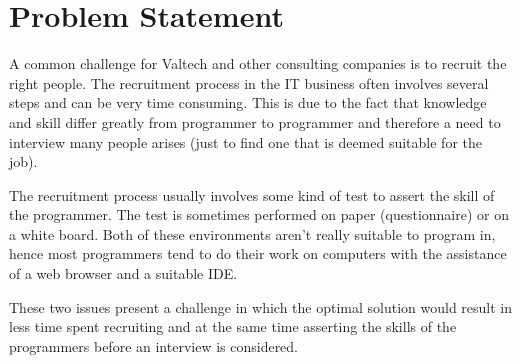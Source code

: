 \section{Problem Statement}
A common challenge for Valtech and other consulting companies is to recruit the right people.  The recruitment process in the IT business often involves several steps and can be very time consuming. This is due to the fact that knowledge and skill differ greatly from programmer to programmer and therefore a need to interview many people arises (just to find one that is deemed suitable for the job). 

The recruitment process usually involves some kind of test to assert the skill of the programmer. The test is sometimes performed on paper (questionnaire) or on a white board. Both of these environments aren't really suitable to program in, hence most programmers tend to do their work on computers with the assistance of a web browser and a suitable IDE. 

These two issues present a challenge in which the optimal solution would result in less time spent recruiting and at the same time asserting the skills of the programmers before an interview is considered.